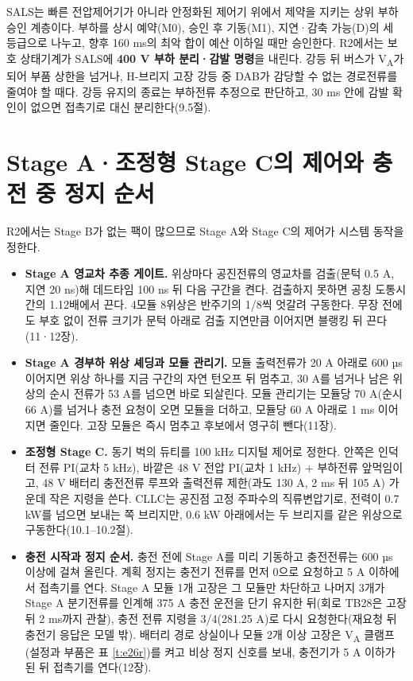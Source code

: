 SALS는 빠른 전압제어기가 아니라 안정화된 제어기 위에서 제약을 지키는 상위 부하 승인 계층이다\cite{b8}. 부하를 상시 예약(M0), 승인 후 기동(M1), 지연·감축 가능(D)의 세 등급으로 나누고, 향후 160 ms의 최악 합이 예산 이하일 때만 승인한다. R2에서는 보호 상태기계가 SALS에 \textbf{400 V 부하 분리·감발 명령}을 내린다. 강등 뒤 버스가 V\textsubscript{A}가 되어 부품 상한을 넘거나, H-브리지 고장 강등 중 DAB가 감당할 수 없는 경로전류를 줄여야 할 때다. 강등 유지의 종료는 부하전류 추정으로 판단하고, 30 ms 안에 감발 확인이 없으면 접촉기로 대신 분리한다(9.5절).

\section{Stage A·조정형 Stage C의 제어와 충전 중 정지 순서}

R2에서는 Stage B가 없는 팩이 많으므로 Stage A와 Stage C의 제어가 시스템 동작을 정한다.

\begin{itemize}
\item \textbf{Stage A 영교차 추종 게이트.} 위상마다 공진전류의 영교차를 검출(문턱 0.5 A, 지연 20 ns)해 데드타임 100 ns 뒤 다음 구간을 켠다. 검출하지 못하면 공칭 도통시간의 1.12배에서 끈다. 4모듈 8위상은 반주기의 1/8씩 엇갈려 구동한다. 무장 전에도 부호 없이 전류 크기가 문턱 아래로 검출 지연만큼 이어지면 블랭킹 뒤 끈다(11·12장).
\item \textbf{Stage A 경부하 위상 셰딩과 모듈 관리기.} 모듈 출력전류가 20 A 아래로 600 µs 이어지면 위상 하나를 지금 구간의 자연 턴오프 뒤 멈추고, 30 A를 넘거나 남은 위상의 순시 전류가 53 A를 넘으면 바로 되살린다. 모듈 관리기는 모듈당 70 A(순시 66 A)를 넘거나 충전 요청이 오면 모듈을 더하고, 모듈당 60 A 아래로 1 ms 이어지면 줄인다. 고장 모듈은 즉시 멈추고 후보에서 영구히 뺀다(11장).
\item \textbf{조정형 Stage C.} 동기 벅의 듀티를 100 kHz 디지털 제어로 정한다. 안쪽은 인덕터 전류 PI(교차 5 kHz), 바깥은 48 V 전압 PI(교차 1 kHz) + 부하전류 앞먹임이고, 48 V 배터리 충전전류 루프와 출력전류 제한(과도 130 A, 2 ms 뒤 105 A) 가운데 작은 지령을 쓴다. CLLC는 공진점 고정 주파수의 직류변압기로, 전력이 0.7 kW를 넘으면 보내는 쪽 브리지만, 0.6 kW 아래에서는 두 브리지를 같은 위상으로 구동한다(10.1–10.2절).
\item \textbf{충전 시작과 정지 순서.} 충전 전에 Stage A를 미리 기동하고 충전전류는 600 µs 이상에 걸쳐 올린다. 계획 정지는 충전기 전류를 먼저 0으로 요청하고 5 A 이하에서 접촉기를 연다. Stage A 모듈 1개 고장은 그 모듈만 차단하고 나머지 3개가 Stage A 분기전류를 인계해 375 A 충전 운전을 단기 유지한 뒤(회로 TB28은 고장 뒤 2 ms까지 관찰), 충전 전류 지령을 3/4(281.25 A)로 다시 요청한다(재요청 뒤 충전기 응답은 모델 밖). 배터리 경로 상실이나 모듈 2개 이상 고장은 V\textsubscript{A} 클램프(설정과 부품은 표 \ref{t:e26r})를 켜고 비상 정지 신호를 보내, 충전기가 5 A 이하가 된 뒤 접촉기를 연다(12장).
\end{itemize}
